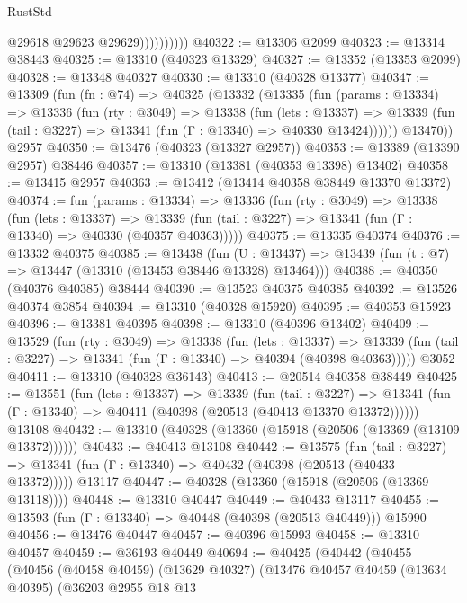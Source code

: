 \begin{lexlean}{RustStd}
\begin{coremodule}
                        @29618
                        @29623
                        @29629))))))))))
@40322 := @13306 @2099
@40323 := @13314 @38443
@40325 := @13310 (@40323 @13329)
@40327 := @13352 (@13353 @2099)
@40328 := @13348 @40327
@40330 := @13310 (@40328 @13377)
@40347 := @13309
    (fun (fn : @74) =>
    @40325
      (@13332
        (@13335
          (fun (params : @13334) =>
          @13336
            (fun (rty : @3049) =>
            @13338
              (fun (lets : @13337) =>
              @13339 (fun (tail : @3227) => @13341 (fun (Γ : @13340) => @40330 @13424))))))
        @13470))
    @2957
@40350 := @13476 (@40323 (@13327 @2957))
@40353 := @13389 (@13390 @2957) @38446
@40357 := @13310 (@13381 (@40353 @13398) @13402)
@40358 := @13415 @2957
@40363 := @13412 (@13414 @40358 @38449 @13370 @13372)
@40374 := fun (params : @13334) =>
  @13336
    (fun (rty : @3049) =>
    @13338
      (fun (lets : @13337) =>
      @13339 (fun (tail : @3227) => @13341 (fun (Γ : @13340) => @40330 (@40357 @40363)))))
@40375 := @13335 @40374
@40376 := @13332 @40375
@40385 := @13438
    (fun (U : @13437) => @13439 (fun (t : @7) => @13447 (@13310 (@13453 @38446 @13328) @13464)))
@40388 := @40350 (@40376 @40385) @38444
@40390 := @13523 @40375 @40385
@40392 := @13526 @40374 @3854
@40394 := @13310 (@40328 @15920)
@40395 := @40353 @15923
@40396 := @13381 @40395
@40398 := @13310 (@40396 @13402)
@40409 := @13529
    (fun (rty : @3049) =>
    @13338
      (fun (lets : @13337) =>
      @13339 (fun (tail : @3227) => @13341 (fun (Γ : @13340) => @40394 (@40398 @40363)))))
    @3052
@40411 := @13310 (@40328 @36143)
@40413 := @20514 @40358 @38449
@40425 := @13551
    (fun (lets : @13337) =>
    @13339
      (fun (tail : @3227) =>
      @13341 (fun (Γ : @13340) => @40411 (@40398 (@20513 (@40413 @13370 @13372))))))
    @13108
@40432 := @13310 (@40328 (@13360 (@15918 (@20506 (@13369 (@13109 @13372))))))
@40433 := @40413 @13108
@40442 := @13575
    (fun (tail : @3227) => @13341 (fun (Γ : @13340) => @40432 (@40398 (@20513 (@40433 @13372)))))
    @13117
@40447 := @40328 (@13360 (@15918 (@20506 (@13369 @13118))))
@40448 := @13310 @40447
@40449 := @40433 @13117
@40455 := @13593 (fun (Γ : @13340) => @40448 (@40398 (@20513 @40449))) @15990
@40456 := @13476 @40447
@40457 := @40396 @15993
@40458 := @13310 @40457
@40459 := @36193 @40449
@40694 := @40425
    (@40442
      (@40455
        (@40456
          (@40458 @40459)
          (@13629 @40327)
          (@13476
            @40457
            @40459
            (@13634 @40395)
            (@36203
              @2955
              @18
              @13

\end{coremodule}
\end{lexlean}

